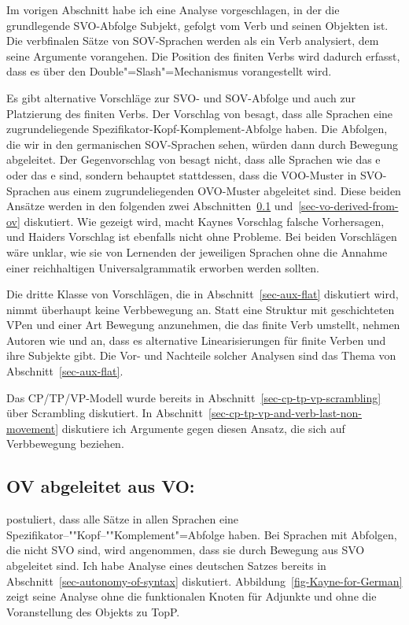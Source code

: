 Im vorigen Abschnitt habe ich eine Analyse vorgeschlagen, in der die grundlegende SVO-Abfolge
Subjekt, gefolgt vom Verb und seinen Objekten ist. Die verbfinalen Sätze von SOV-Sprachen
werden als ein Verb analysiert, dem seine Argumente vorangehen. Die Position des finiten Verbs
wird dadurch erfasst, dass es über den Double"=Slash"=Mechanismus vorangestellt wird.

Es gibt alternative Vorschläge zur SVO- und SOV-Abfolge und auch zur Platzierung des finiten
Verbs. Der Vorschlag von \citet{Kayne94a-u} besagt, dass alle Sprachen eine zugrundeliegende
Spezifikator-Kopf-Komplement-Abfolge haben. Die Abfolgen, die wir in den germanischen SOV-Sprachen sehen, würden dann
durch Bewegung abgeleitet. Der Gegenvorschlag von \citet{Haider2000a,Haider2020a} besagt nicht, dass alle Sprachen
wie das e oder das e sind, sondern behauptet stattdessen, dass die VOO-Muster in SVO-Sprachen
aus einem zugrundeliegenden OVO-Muster abgeleitet sind. Diese beiden Ansätze werden in den folgenden zwei Abschnitten~\ref{sec-ov-derived-from-vo} und~\ref{sec-vo-derived-from-ov} diskutiert. Wie gezeigt wird,
macht Kaynes Vorschlag
falsche Vorhersagen, und Haiders Vorschlag ist ebenfalls nicht ohne Probleme. Bei
beiden Vorschlägen wäre unklar, wie sie von Lernenden der jeweiligen
Sprachen ohne die Annahme einer reichhaltigen Universalgrammatik erworben werden sollten.

Die dritte Klasse von Vorschlägen, die in Abschnitt~\ref{sec-aux-flat} diskutiert wird, nimmt überhaupt keine
Verbbewegung an. Statt eine Struktur mit geschichteten VPen und einer Art Bewegung anzunehmen, die das
finite Verb umstellt, nehmen Autoren wie \citet*{GKPS85a} und \citet{Sag2020a} an, dass es alternative
Linearisierungen für finite Verben und ihre Subjekte gibt. Die Vor- und Nachteile solcher Analysen sind das Thema
von Abschnitt~\ref{sec-aux-flat}.

Das CP/TP/VP-Modell wurde bereits in Abschnitt~\ref{sec-cp-tp-vp-scrambling} über Scrambling diskutiert.
In Abschnitt~\ref{sec-cp-tp-vp-and-verb-last-non-movement} diskutiere ich Argumente gegen diesen
Ansatz, die sich auf Verbbewegung beziehen.

\subsection{OV abgeleitet aus VO: \citet{Kayne94a-u}}
\label{sec-ov-derived-from-vo}

\citet{Kayne94a-u} postuliert, dass alle Sätze in allen Sprachen eine Spezifikator–""Kopf–""Komplement"=Abfolge
haben. Bei Sprachen mit Abfolgen, die nicht SVO sind, wird angenommen, dass sie durch Bewegung aus SVO abgeleitet sind. Ich
habe  Analyse eines deutschen Satzes bereits in
Abschnitt~\ref{sec-autonomy-of-syntax} diskutiert. Abbildung~\ref{fig-Kayne-for-German} zeigt seine Analyse ohne
die funktionalen Knoten für Adjunkte und ohne die Voranstellung des Objekts zu TopP.

